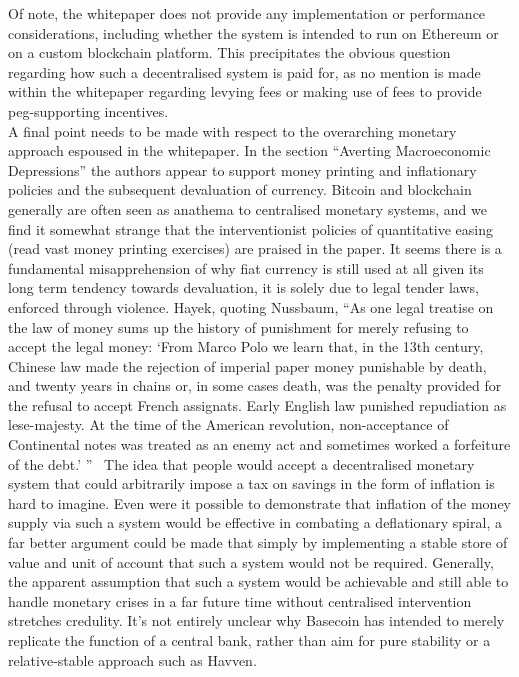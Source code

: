 \noindent Of note, the whitepaper does not provide any implementation or performance considerations, including whether the system is intended to run on Ethereum or on a custom blockchain platform. This precipitates the obvious question regarding how such a decentralised system is paid for, as no mention is made within the whitepaper regarding levying fees or making use of fees to provide peg-supporting incentives. \\

\noindent A final point needs to be made with respect to the overarching monetary approach espoused in the whitepaper. In the section ``Averting Macroeconomic Depressions'' the authors appear to support money printing and inflationary policies and the subsequent devaluation of currency. Bitcoin and blockchain generally are often seen as anathema to centralised monetary systems, and we find it somewhat strange that the interventionist policies of quantitative easing (read vast money printing exercises) are praised in the paper. It seems there is a fundamental misapprehension of why fiat currency is still used at all given its long term tendency towards devaluation, it is solely due to legal tender laws, enforced through violence. Hayek, quoting Nussbaum, ``As one legal treatise on the law of money sums up the history of punishment for merely refusing to accept the legal money: `From Marco Polo we learn that, in the 13th century, Chinese law made the rejection of imperial paper money punishable by death, and twenty years in chains or, in some cases death, was the penalty provided for the refusal to accept French assignats. Early English law punished repudiation as lese-majesty. At the time of the American revolution, non-acceptance of Continental notes was treated as an enemy act and sometimes worked a forfeiture of the debt.' ''~\cite{hayek1976denationalisation} The idea that people would accept a decentralised monetary system that could arbitrarily impose a tax on savings in the form of inflation is hard to imagine. Even were it possible to demonstrate that inflation of the money supply via such a system would be effective in combating a deflationary spiral, a far better argument could be made that simply by implementing a stable store of value and unit of account that such a system would not be required. Generally, the apparent assumption that such a system would be achievable and still able to handle monetary crises in a far future time without centralised intervention stretches credulity. It's not entirely unclear why Basecoin has intended to merely replicate the function of a central bank, rather than aim for pure stability or a relative-stable approach such as Havven. \\

